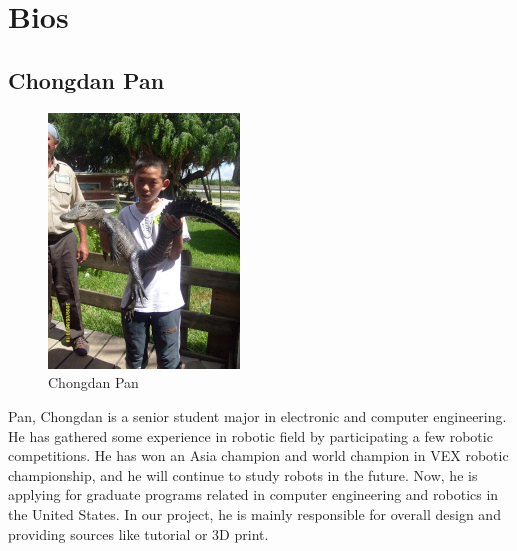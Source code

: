 \documentclass[12pt]{article}
\newcommand{\gadd}[1]{{\color{gray} #1}}
\begin{document}
\section{Bios}
\gadd{
\subsection{Chongdan Pan}
\begin{figure}[H]
    \centering
    \includegraphics[width=2in]{p.jpg}
    \caption{Chongdan Pan}
    \label{fig::pan}
\end{figure}
Pan, Chongdan is a senior student major in electronic and computer engineering. He has gathered some experience in robotic field by participating a few robotic competitions. He has won an Asia champion and world champion in VEX robotic championship, and he will continue to study robots in the future. Now, he is applying for graduate programs related in computer engineering and robotics in the United States. In our project, he is mainly responsible for overall design and providing sources like tutorial or 3D print.
}
\end{document}
